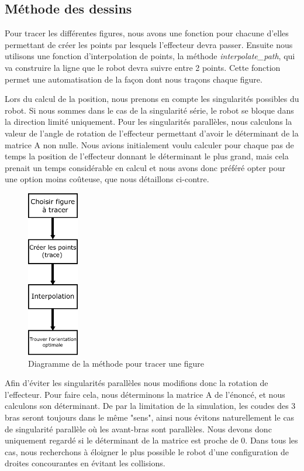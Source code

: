 \documentclass[a4paper, 11pt]{report}
\begin{document}
\subsection{Méthode des dessins}


Pour tracer les différentes figures, nous avons une fonction pour chacune d'elles permettant de créer les points par lesquels l'effecteur devra passer. Ensuite nous utilisons une fonction d'interpolation de points, la méthode \textit{interpolate\_path}, qui va construire la ligne que le robot devra suivre entre 2 points. Cette fonction permet une automatisation de la façon dont nous traçons chaque figure.

Lors du calcul de la position, nous prenons en compte les singularités possibles du robot. Si nous sommes dans le cas de la singularité série, le robot se bloque dans la direction limité uniquement. Pour les singularités parallèles, nous calculons la valeur de l'angle de rotation de l'effecteur permettant d'avoir le déterminant de la matrice A non nulle. Nous avions initialement voulu calculer pour chaque pas de temps la position de l'effecteur donnant le déterminant le plus grand, mais cela prenait un temps considérable en calcul et nous avons donc préféré opter pour une option moins coûteuse, que nous détaillons ci-contre.
\begin{figure}[!htb]
    \centering
    \includegraphics[width=0.2\textwidth]{Figures/diag_trace_method.pdf}
    \caption{Diagramme de la méthode pour tracer une figure}
    \label{fig:diag_tracemethode}
\end{figure}

Afin d'éviter les singularités parallèles nous modifions donc la rotation de l'effecteur. Pour faire cela, nous déterminons la matrice A de l'énoncé, et nous calculons son déterminant. De par la limitation de la simulation, les coudes des 3 bras seront toujours dans le même "sens", ainsi nous évitons naturellement le cas de singularité parallèle où les avant-bras sont parallèles. Nous devons donc uniquement regardé si le déterminant de la matrice est proche de 0. Dans tous les cas, nous recherchons à éloigner le plus possible le robot d'une configuration de droites concourantes en évitant les collisions.
\end{document}
